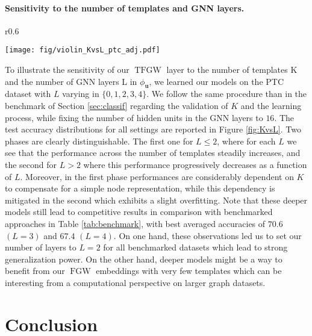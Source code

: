 \documentclass{article}
\newcommand{\FGW}{\operatorname{FGW}}
\newcommand{\TFGW}{\operatorname{TFGW}}
\begin{document}
{\paragraph{Sensitivity to the number of templates and GNN layers.}
\begin{wrapfigure}{r}{0.6\textwidth}  \vspace{-6mm}
	\begin{center}
		\texttt{[image: fig/violin\_KvsL\_ptc\_adj.pdf]}
	\end{center}
	\caption{\label{fig:KvsL}Test accuracy distributions by number of templates and number of GNN layers.\vspace{-2mm}}
\end{wrapfigure}
 To illustrate the sensitivity of our $\TFGW$ layer to the number of templates K
 and the number of GNN layers L in $\phi_{\mathbf{u}}$, we learned our models on the PTC dataset with $L$ varying in $\{0,1,2,3,4\}$. We follow the same
 procedure than in the benchmark of Section \ref{sec:classif} regarding the
 validation of $K$ and the learning process, while fixing the number of hidden
 units in the GNN layers to $16$. The test accuracy distributions for all settings
 are reported in Figure \ref{fig:KvsL}. Two phases are clearly distinguishable.
 The first one for $L \leq 2$, where for each $L$ we see that the performance
 across the number of templates steadily increases, and the second for $L>2$
 where this performance progressively decreases as a function of $L$. Moreover, in the first phase
 performances are considerably dependent on $K$ to compensate for a simple node representation, while this dependency is
 mitigated in the second which exhibits a slight overfitting. Note that these deeper
 models still lead to competitive results in comparison with benchmarked
 approaches in Table \ref{tab:benchmark}, with best averaged accuracies of
 $70.6$ $(L=3)$ and $67.4$ $(L=4)$. On one hand, these observations led us to
 set our number of layers to $L=2$ for all benchmarked datasets which lead to strong generalization power. On the other hand, deeper models might be a way to
 benefit from our $\FGW$ embeddings with very few templates which can be
 interesting from a computational perspective on larger graph datasets. 	\label{sec:experiments}
	
	\section{Conclusion}
	



}
\end{document}
